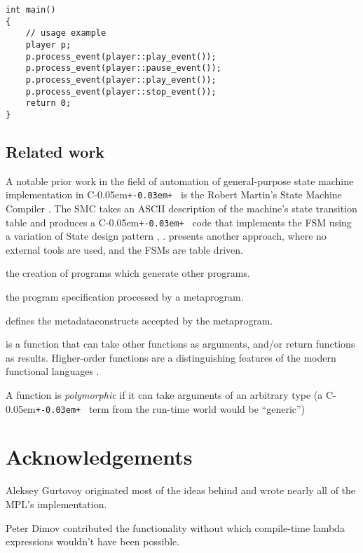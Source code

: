 \documentclass{kapproc}
\newcommand{\Cpp}{C\kern-0.05em\texttt{+\kern-0.03em+}%
}
\newcommand{\mpgm}{meta\-pro\-gram}
\newcommand{\mdat}{meta\-data}
\begin{document}
{\small
\begin{codesamp}\begin{verbatim}
int main()
{
    // usage example
    player p;
    p.process_event(player::play_event());
    p.process_event(player::pause_event());
    p.process_event(player::play_event());
    p.process_event(player::stop_event());
    return 0;
}
\end{verbatim}
\end{codesamp}
}

\subsection{Related work}

A notable prior work in the field of automation of general-purpose 
state machine implementation in \Cpp\ is the Robert Martin's State 
Machine Compiler \cite{SMC}. The SMC takes an ASCII description of the 
machine's state transition table and produces a \Cpp\ code that 
implements the FSM using a variation of State design pattern \cite{Hun91},
\cite{GHJ+95}. \cite{Laf00} presents another approach, where no external tools 
are used, and the FSMs are table driven. 


\begin{glossary}
   the creation of programs which generate other
  programs.

   the program specification processed by a \mpgm.

   defines the \mdat constructs accepted by the \mpgm.

   is a function that can take other
  functions as arguments, and/or return functions as
  results. Higher-order functions are a distinguishing features of the
  modern functional languages \cite{Hud79}.

   A function is \emph{polymorphic} if it can take
  arguments of an arbitrary type (a \Cpp\ term from the run-time world
  would be ``generic'')
\end{glossary}

\section{Acknowledgements}

Aleksey Gurtovoy originated most of the ideas behind and wrote nearly
all of the MPL's implementation.

Peter Dimov contributed the  functionality without which
compile-time lambda expressions wouldn't have been possible.
\end{document}

